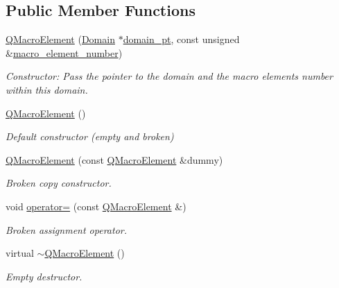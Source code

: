 \subsection*{Public Member Functions}
\begin{DoxyCompactItemize}
\item 
\hyperlink{classoomph_1_1QMacroElement_3_012_01_4_a9a9a57f0903e521371ce99c06f81154f}{Q\+Macro\+Element} (\hyperlink{classoomph_1_1Domain}{Domain} $\ast$\hyperlink{classoomph_1_1MacroElement_ab086ff8cbdb656eff8ab5eafd67bca07}{domain\+\_\+pt}, const unsigned \&\hyperlink{classoomph_1_1MacroElement_acc146caf3839d234c62cf9a4de2fbe91}{macro\+\_\+element\+\_\+number})
\begin{DoxyCompactList}\small\item\em Constructor\+: Pass the pointer to the domain and the macro element\textquotesingle{}s number within this domain. \end{DoxyCompactList}\item 
\hyperlink{classoomph_1_1QMacroElement_3_012_01_4_ab709c20b82b4959edfa566b17e1b5441}{Q\+Macro\+Element} ()
\begin{DoxyCompactList}\small\item\em Default constructor (empty and broken) \end{DoxyCompactList}\item 
\hyperlink{classoomph_1_1QMacroElement_3_012_01_4_afb16986bbc009e8d23a434d6dc6631bc}{Q\+Macro\+Element} (const \hyperlink{classoomph_1_1QMacroElement}{Q\+Macro\+Element} \&dummy)
\begin{DoxyCompactList}\small\item\em Broken copy constructor. \end{DoxyCompactList}\item 
void \hyperlink{classoomph_1_1QMacroElement_3_012_01_4_a641551a6b40ff5b364eb10da19af8edf}{operator=} (const \hyperlink{classoomph_1_1QMacroElement}{Q\+Macro\+Element} \&)
\begin{DoxyCompactList}\small\item\em Broken assignment operator. \end{DoxyCompactList}\item 
virtual \hyperlink{classoomph_1_1QMacroElement_3_012_01_4_a5645cf8b388a4d7d51c1893d886db0cd}{$\sim$\+Q\+Macro\+Element} ()
\begin{DoxyCompactList}\small\item\em Empty destructor. \end{DoxyCompactList}\item 

\end{DoxyCompactItemize}
